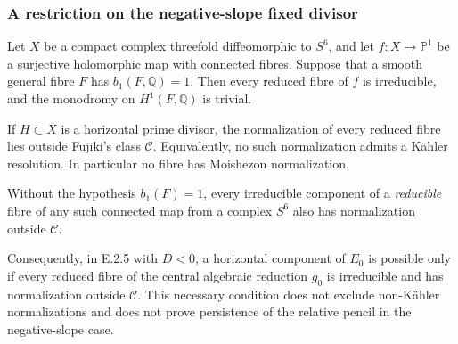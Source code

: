 \subsubsection*{A restriction on the negative-slope fixed divisor}

\begin{proposition}
Let $X$ be a compact complex threefold diffeomorphic to $S^6$, and
let $f:X\to\mathbb P^1$ be a surjective holomorphic map with
connected fibres.  Suppose that a smooth general fibre $F$ has
$b_1(F,\mathbb Q)=1$.  Then every reduced fibre of $f$ is
irreducible, and the monodromy on $H^1(F,\mathbb Q)$ is trivial.

If $H\subset X$ is a horizontal prime divisor, the normalization
of every reduced fibre lies outside Fujiki's class $\mathcal C$.
Equivalently, no such normalization admits a K\"ahler resolution.
In particular no fibre has Moishezon normalization.

Without the hypothesis $b_1(F)=1$, every irreducible component
of a \emph{reducible} fibre of any such connected map from a
complex $S^6$ also has normalization outside $\mathcal C$.

Consequently, in E.2.5 with $D<0$, a horizontal component of
$E_0$ is possible only if every reduced fibre of the central
algebraic reduction $g_0$ is irreducible and has normalization
outside $\mathcal C$.  This necessary condition does not exclude
non-K\"ahler normalizations and does not prove persistence of the
relative pencil in the negative-slope case.
\end{proposition}
